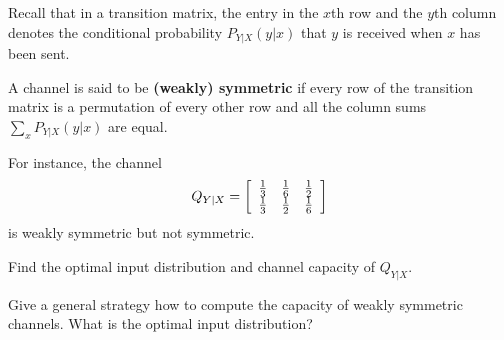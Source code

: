 \documentclass[a4paper,10pt,landscape,twocolumn]{scrartcl}
\begin{document}
\begin{exercise}
Recall that in a transition matrix, the entry in the $x$th row and the $y$th column denotes the conditional probability $P_{Y|X}(y|x)$ that $y$ is received when $x$ has been sent.


A channel is said to be \textbf{(weakly) symmetric} if every row of the transition matrix is a permutation of every other row and all the column sums $\sum_x P_{Y|X}(y|x)$ are equal.

For instance, %
the channel
\[
Q_{Y|X} = \left[
\begin{array}{c c c}
\frac{1}{3}&\frac{1}{6}&\frac{1}{2}\\
\frac{1}{3}&\frac{1}{2}&\frac{1}{6}
\end{array}
\right]
\]
is weakly symmetric but not symmetric.
	\begin{subex}
	Find the optimal input distribution and channel capacity of $Q_{Y|X}$.
	\end{subex}
	\begin{subex}
	Give a general strategy how to compute the capacity of weakly symmetric channels. What is the optimal input distribution?
	\end{subex}
\end{exercise}
\end{document}
